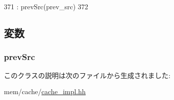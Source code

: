 \begin{DoxyCode}
371                                            : prevSrc(prev_src)
372     {}
\end{DoxyCode}


\subsection{変数}
\hypertarget{classForwardResponseRecord_af59c6a6dab3866db905d859decb9a0fe}{
\subsubsection[{prevSrc}]{ {\bf prevSrc}}}
\label{classForwardResponseRecord_af59c6a6dab3866db905d859decb9a0fe}


このクラスの説明は次のファイルから生成されました:\begin{DoxyCompactItemize}
\item 
mem/cache/\hyperlink{cache__impl_8hh}{cache\_\-impl.hh}\end{DoxyCompactItemize}
